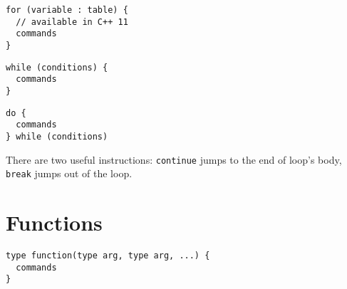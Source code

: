 \documentclass{programmingnotes}
\begin{document}
\begin{multicols*}{3}
\begin{verbatim}
for (variable : table) {
  // available in C++ 11
  commands
}
\end{verbatim}

\begin{verbatim}
while (conditions) {
  commands
}
\end{verbatim}

\begin{verbatim}
do {
  commands
} while (conditions)
\end{verbatim}

There are two useful instructions: \texttt{continue} jumps to the end of loop's body, \texttt{break} jumps out of the loop.

\section{Functions}
\begin{verbatim}
type function(type arg, type arg, ...) {
  commands
}
\end{verbatim}

\end{multicols*}
\end{document}
